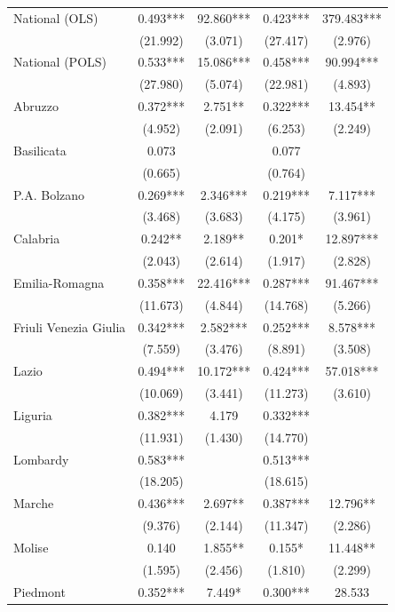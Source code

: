 \documentclass[12pt]{article}
\begin{document}
\begin{longtable}{@{}lcccc@{}}
        National (OLS) & 0.493*** & 92.860*** & 0.423*** & 379.483*** \\ 
         & (21.992) & (3.071) & (27.417) & (2.976) \\ 
        National (POLS) & 0.533*** & 15.086*** & 0.458*** & 90.994*** \\ 
         & (27.980) & (5.074) & (22.981) & (4.893) \\ 
        Abruzzo & 0.372*** & 2.751** & 0.322*** & 13.454** \\ 
         & (4.952) & (2.091) & (6.253) & (2.249) \\ 
        Basilicata & 0.073 &  & 0.077 &  \\ 
         & (0.665) &  & (0.764) &  \\ 
        P.A. Bolzano & 0.269*** & 2.346*** & 0.219*** & 7.117*** \\ 
         & (3.468) & (3.683) & (4.175) & (3.961) \\ 
        Calabria & 0.242** & 2.189** & 0.201* & 12.897*** \\ 
         & (2.043) & (2.614) & (1.917) & (2.828) \\ 
        Emilia-Romagna & 0.358*** & 22.416*** & 0.287*** & 91.467*** \\ 
         & (11.673) & (4.844) & (14.768) & (5.266) \\ 
        Friuli Venezia Giulia & 0.342*** & 2.582*** & 0.252*** & 8.578*** \\ 
         & (7.559) & (3.476) & (8.891) & (3.508) \\ 
        Lazio & 0.494*** & 10.172*** & 0.424*** & 57.018*** \\ 
         & (10.069) & (3.441) & (11.273) & (3.610) \\ 
        Liguria & 0.382*** & 4.179 & 0.332*** &  \\ 
         & (11.931) & (1.430) & (14.770) &  \\ 
        Lombardy & 0.583*** &  & 0.513*** &  \\ 
         & (18.205) &  & (18.615) &  \\ 
        Marche & 0.436*** & 2.697** & 0.387*** & 12.796** \\ 
         & (9.376) & (2.144) & (11.347) & (2.286) \\ 
        Molise & 0.140 & 1.855** & 0.155* & 11.448** \\ 
         & (1.595) & (2.456) & (1.810) & (2.299) \\ 
        Piedmont & 0.352*** & 7.449* & 0.300*** & 28.533 \\ 

\end{longtable}
\end{document}
